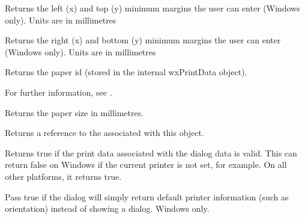 
Returns the left (x) and top (y) minimum margins the user can enter (Windows only). Units
are in millimetres

\label{wxpagesetupdialogdatagetminmarginbottomright}


Returns the right (x) and bottom (y) minimum margins the user can enter (Windows only). Units
are in millimetres

\label{wxpagesetupdialogdatagetpaperid}


Returns the paper id (stored in the internal wxPrintData object).

For further information, see .

\label{wxpagesetupdialogdatagetpapersize}


Returns the paper size in millimetres.

\label{wxpagesetupdialogdatagetprintdata}


Returns a reference to the  associated with this object.

\label{wxpagesetupdialogdataok}


Returns true if the print data associated with the dialog data is valid.
This can return false on Windows if the current printer is not set, for example.
On all other platforms, it returns true.

\label{wxpagesetupdialogdatasetdefaultinfo}


Pass true if the dialog will simply return default printer information (such as orientation)
instead of showing a dialog. Windows only.

\label{wxpagesetupdialogdatasetdefaultminmargins}

